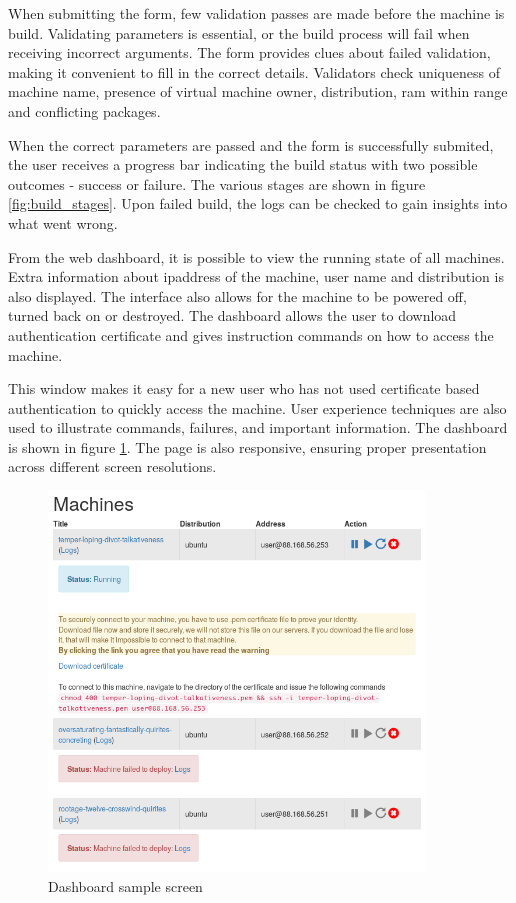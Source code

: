 \documentclass{article}
\begin{document}
When submitting the form, few validation passes are made before the machine is build. Validating parameters is essential, or the build process will fail when receiving incorrect arguments. The form provides clues about failed validation, making it convenient to fill in the correct details. 
Validators check uniqueness of machine name, presence of virtual machine owner, distribution, \gls{ram} within range and conflicting packages.

When the correct parameters are passed and the form is successfully submited, the user receives a progress bar indicating the build status with two possible outcomes - success or failure. The various stages are shown in figure \ref{fig:build_stages}.
Upon failed build, the logs can be checked to gain insights into what went wrong. 

From the web dashboard, it is possible to view the running state of all machines. Extra information about \gls{ipaddress} of the machine, user name and distribution is also displayed. The interface also allows for the machine to be powered off, turned back on or destroyed. The dashboard allows the user to download authentication certificate and gives instruction commands on how to access the machine.

This window makes it easy for a new user who has not used certificate based authentication to quickly access the machine. User experience techniques are also used to illustrate commands, failures, and important information. The dashboard is shown in figure \ref{fig:web-interface-dashboard}. The page is also responsive, ensuring proper presentation across different screen resolutions.

\begin{figure}[H]
	\vspace{0.5cm}
	\includegraphics[width=10cm]{dashboard}
	\vspace{0.5cm}
	\caption{Dashboard sample screen}
	\label{fig:web-interface-dashboard}
\end{figure}
\end{document}
